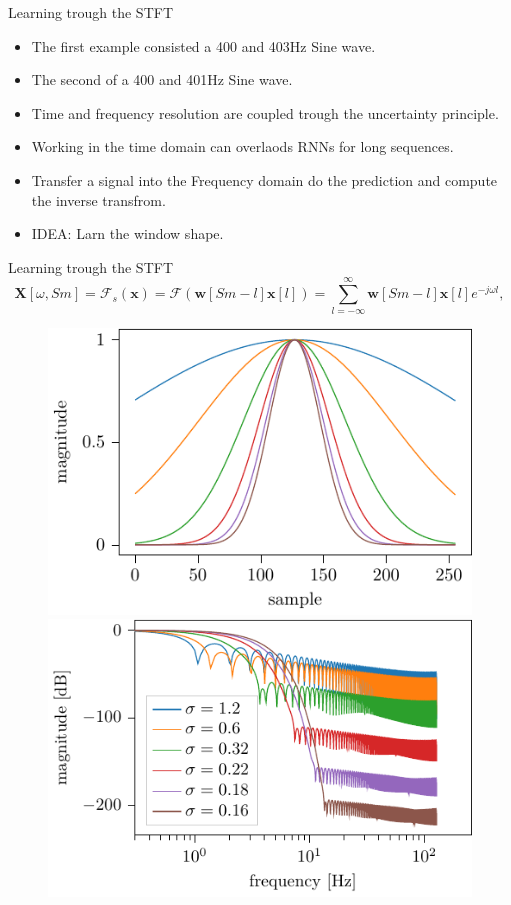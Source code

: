 \documentclass[xcolor=dvipsnames]{beamer}
\begin{document}
\begin{frame}{Learning trough the STFT}
\begin{itemize}
\item The first example consisted a 400 and 403Hz Sine wave.
\item The second of a 400 and 401Hz Sine wave.
\item Time and frequency resolution are coupled trough the uncertainty principle.
\item Working in the time domain can overlaods RNNs for long sequences.
\item Transfer a signal into the Frequency domain do the prediction and compute the inverse transfrom.
\item IDEA: Larn the window shape.

\end{itemize}
\end{frame}

\begin{frame}{Learning trough the STFT}
\begin{equation}
    \mathbf{X} [\omega, Sm] 
    = \mathcal{F}_s\left(\mathbf{x}\right) = \mathcal{F}\left(\mathbf{w}[Sm - l]\mathbf{x}[l]\right) = \sum_{l = -\infty}^{\infty} \mathbf{w}[Sm - l]\mathbf{x}[l]e^{-j\omega l},
    \label{eq:STFT}
\end{equation}
\begin{figure}
    \centering
    \includegraphics[width=0.49\linewidth]{./img/gaussian_window_sigma_plot.pdf}
    \includegraphics[width=0.49\linewidth]{./img/gaussian_window_sigma_freq_plot.pdf}
\end{figure}
\end{frame}
\end{document}
